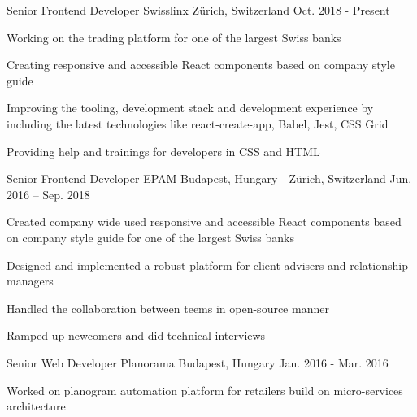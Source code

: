 

\begin{cventries}

  \cventry
    {Senior Frontend Developer} %
    {Swisslinx} %
    {Zürich, Switzerland} %
    {Oct. 2018 - Present} %
    {
      \begin{cvitems} %
        \item {Working on the trading platform for one of the largest Swiss banks}
        \item {Creating responsive and accessible React components based on company style guide}
        \item {Improving the tooling, development stack and development experience by including the latest technologies like react-create-app, Babel, Jest, CSS Grid}
        \item {Providing help and trainings for developers in CSS and HTML}
      \end{cvitems}
    }

  \cventry
    {Senior Frontend Developer} %
    {EPAM} %
    {Budapest, Hungary - Zürich, Switzerland} %
    {Jun. 2016 – Sep. 2018} %
    {
      \begin{cvitems} %
        \item {Created company wide used responsive and accessible React components based on company style guide for one of the largest Swiss banks}
        \item {Designed and implemented a robust platform for client advisers and relationship managers}
        \item {Handled the collaboration between teems in open-source manner}
        \item {Ramped-up newcomers and did technical interviews}
      \end{cvitems}
    }

  \cventry
    {Senior Web Developer} %
    {Planorama} %
    {Budapest, Hungary} %
    {Jan. 2016 - Mar. 2016} %
    {
      \begin{cvitems} %
        \item {Worked on planogram automation platform for retailers build on micro-services architecture}
      \end{cvitems}
    }


\end{cventries}
